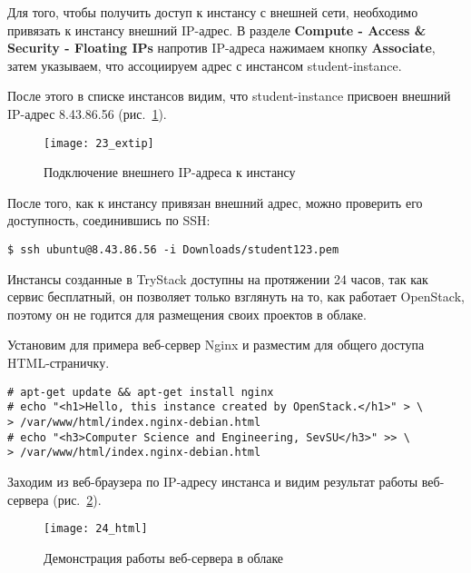 \clearpage

Для того, чтобы получить доступ к инстансу с внешней сети, необходимо привязать к инстансу внешний IP-адрес.
В разделе \textbf{Compute - Access \& Security - Floating IPs} напротив IP-адреса нажимаем кнопку \textbf{Associate}, затем указываем, что ассоциируем адрес с инстансом student-instance.

После этого в списке инстансов видим, что student-instance присвоен внешний IP-адрес 8.43.86.56 (рис.~\ref{pic:extip}).
\begin{figure}[ht]
    \centering
    \texttt{[image: 23\_extip]}
    \caption{Подключение внешнего IP-адреса к инстансу}\label{pic:extip}
\end{figure}

После того, как к инстансу привязан внешний адрес, можно проверить его доступность, соединившись по SSH:
\begin{lstlisting}
$ ssh ubuntu@8.43.86.56 -i Downloads/student123.pem
\end{lstlisting}

Инстансы созданные в TryStack доступны на протяжении 24 часов, так как сервис бесплатный, он позволяет только взглянуть на то, как работает OpenStack, поэтому он не годится для размещения своих проектов в облаке.

Установим для примера веб-сервер Nginx и разместим для общего доступа HTML-страничку.
\begin{lstlisting}
# apt-get update && apt-get install nginx
# echo "<h1>Hello, this instance created by OpenStack.</h1>" > \
> /var/www/html/index.nginx-debian.html
# echo "<h3>Computer Science and Engineering, SevSU</h3>" >> \
> /var/www/html/index.nginx-debian.html
\end{lstlisting}

Заходим из веб-браузера по IP-адресу инстанса и видим результат работы веб-сервера (рис.~\ref{pic:html}).
\begin{figure}[ht]
    \centering
    \texttt{[image: 24\_html]}
    \caption{Демонстрация работы веб-сервера в облаке}\label{pic:html}
\end{figure}

\clearpage
